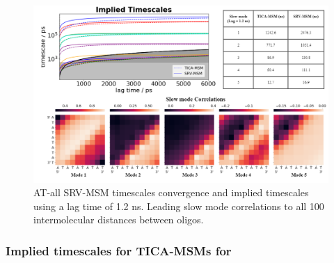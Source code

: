 \documentclass[journal=jpcbfk,manuscript=article]{achemso}
\begin{document}
\begin{figure}[ht!]
	\begin{center}
        \includegraphics[width=\textwidth]{Figs/figs_0804/AT-all_dynamic.png}
        \caption{AT-all SRV-MSM timescales convergence and implied timescales using a lag time of 1.2 ns. Leading slow mode correlations to all 100 intermolecular distances between oligos.}
        \label{fig:AT-all_dynamic}
	\end{center}
\end{figure}

\subsubsection{Implied timescales for TICA-MSMs for }
\end{document}
